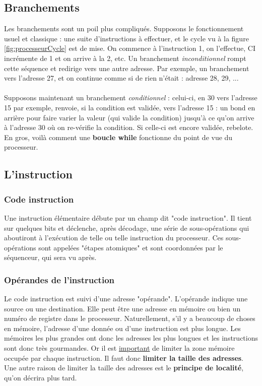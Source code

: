 \documentclass[12pt,a4paper]{report}
\begin{document}
\subsection{Branchements}
Les branchements sont un poil plus compliqués. Supposons le fonctionnement usuel et classique : une suite d'instructions à effectuer, et le cycle vu à la figure \ref{fig:processeurCycle} est de mise. On commence à l'instruction 1, on l'effectue, CI incrémente de 1 et on arrive à la 2, etc. Un branchement \textit{inconditionnel} rompt cette séquence et redirige vers une autre adresse. Par exemple, un branchement vers l'adresse 27, et on continue comme si de rien n'était : adresse 28, 29, ...\\
\\
Supposons maintenant un branchement \textit{conditionnel} : celui-ci, en 30 vers l'adresse 15 par exemple, renvoie, si la condition est validée, vers l'adresse 15 : un bond en arrière pour faire varier la valeur (qui valide la condition) jusqu'à ce qu'on arrive à l'adresse 30 où on re-vérifie la condition. Si celle-ci est encore validée, rebelote. En gros, voilà comment une \textbf{boucle while} fonctionne du point de vue du processeur.
\subsection{L'instruction}
\subsubsection{Code instruction}
Une instruction  élémentaire débute par un champ dit "code instruction". Il tient sur quelques bits et déclenche, après décodage, une série de sous-opérations qui aboutiront à l'exécution de telle ou telle instruction du processeur. Ces sous-opérations sont appelées "étapes atomiques" et sont coordonnées par le séquenceur, qui sera vu après.
\subsubsection{Opérandes de l'instruction}
Le code instruction est suivi d'une adresse "opérande". L'opérande indique une source ou une destination. Elle peut être une adresse en mémoire ou bien un numéro de registre dans le processeur. Naturellement, s'il y a beaucoup de choses en mémoire, l'adresse d'une donnée ou d'une instruction est plus longue. Les mémoires les plus grandes ont donc les adresses les plus longues et les instructions sont donc très gourmandes. Or il est \underline{important} de limiter la zone mémoire occupée par chaque instruction. Il faut donc \textbf{limiter la taille des adresses}. Une autre raison de limiter la taille des adresses est le \textbf{principe de localité}, qu'on décrira plus tard.
\end{document}
